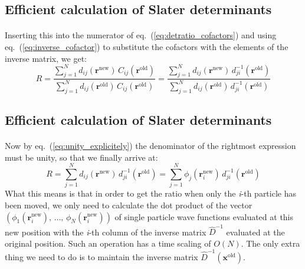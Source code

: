 \documentclass[%
twoside,                 %
final,                   %
10pt]{article}
\begin{document}
\subsection*{Efficient calculation of Slater determinants}

\paragraph{}
Inserting this into the numerator of eq.~(\ref{eq:detratio_cofactors})
and using eq.~(\ref{eq:inverse_cofactor}) to substitute the cofactors
with the elements of the inverse matrix, we get:
\begin{equation}
R =\frac{\sum_{j=1}^N d_{ij}(\mathbf{r}^{\mathrm{new}})\,
C_{ij}(\mathbf{r}^{\mathrm{old}})}
{\sum_{j=1}^N d_{ij}(\mathbf{r}^{\mathrm{old}})\,
C_{ij}(\mathbf{r}^{\mathrm{old}})} =
\frac{\sum_{j=1}^N d_{ij}(\mathbf{r}^{\mathrm{new}})\,
d_{ji}^{-1}(\mathbf{r}^{\mathrm{old}})}
{\sum_{j=1}^N d_{ij}(\mathbf{r}^{\mathrm{old}})\,
d_{ji}^{-1}(\mathbf{r}^{\mathrm{old}})}
\end{equation}


\subsection*{Efficient calculation of Slater determinants}

\paragraph{}

Now by eq.~(\ref{eq:unity_explicitely}) the denominator of the rightmost
expression must be unity, so that we finally arrive at:
\begin{equation}
R =
\sum_{j=1}^N d_{ij}(\mathbf{r}^{\mathrm{new}})\,
d_{ji}^{-1}(\mathbf{r}^{\mathrm{old}}) = 
\sum_{j=1}^N \phi_j(\mathbf{r}_i^{\mathrm{new}})\,
d_{ji}^{-1}(\mathbf{r}^{\mathrm{old}})
\label{eq:detratio_inverse}
\end{equation}
What this means is that in order to get the ratio when only the \emph{i}-th
particle  has been moved, we only need to calculate the dot
product of the vector $\left(\phi_1(\mathbf{r}_i^\mathrm{new}),\,\dots,\,\phi_N(\mathbf{r}_i^\mathrm{new})\right)$ of single particle  wave functions
evaluated at this new position with the \emph{i}-th column of the inverse
matrix $\hat{D}^{-1}$ evaluated at the original position. Such
an operation has a time scaling of $O(N)$. The only extra thing we
need to do is to maintain the inverse matrix $\hat{D}^{-1}(\mathbf{x}^{\mathrm{old}})$.
\end{document}

